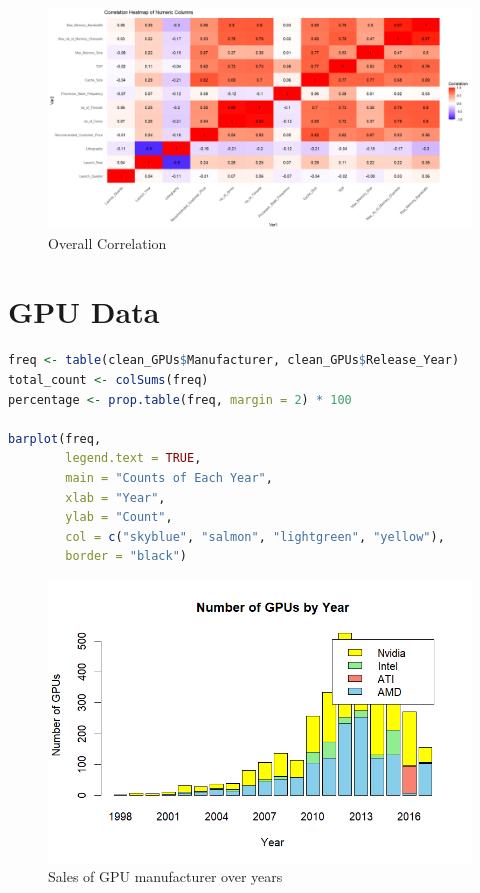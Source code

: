 \begin{figure}[ht]
  \centering
  \includegraphics[width=1\linewidth]{img/CPU_cor.png}
  \vspace{1pt}
  \caption{Overall Correlation}
\end{figure}

\section{GPU Data}

\begin{lstlisting}[language=R]
freq <- table(clean_GPUs$Manufacturer, clean_GPUs$Release_Year)
total_count <- colSums(freq)
percentage <- prop.table(freq, margin = 2) * 100

barplot(freq,
        legend.text = TRUE,
        main = "Counts of Each Year",
        xlab = "Year",
        ylab = "Count",
        col = c("skyblue", "salmon", "lightgreen", "yellow"),
        border = "black")
\end{lstlisting}

\begin{figure}[ht]
  \centering
  \includegraphics[width=1\linewidth]{img/Market_Year.png}
  \vspace{1pt}
  \caption{Sales of GPU manufacturer over years}
\end{figure}

